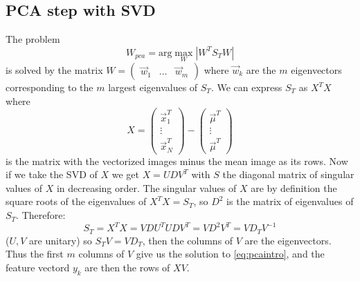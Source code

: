 \documentclass{amsart}
\theoremstyle{definition}
\theoremstyle{remark}
\begin{document}
\subsection{PCA step with SVD}
The problem
\begin{equation*}W_{pca} = \text{arg}\max_W |W^T S_T W|
\label{eq:pca}\end{equation*}
is solved by the matrix 
$W = \begin{pmatrix} \vec{w}_1 & \ldots & \vec{w}_m\end{pmatrix} $
where $\vec{w}_k$ are the $m$ eigenvectors corresponding to the $m$ largest eigenvalues of $S_T$. 
We can express $S_T$ as $X^TX$ where 
$$X = \begin{pmatrix}\vec{x}_1^T\\ \vdots \\ \vec{x}_N^T\end{pmatrix} - \begin{pmatrix} \vec{\mu}^T\\ \vdots \\\vec{\mu}^T\end{pmatrix} $$
is the matrix with the vectorized images minus the mean image as its rows. 
Now if we take the SVD of $X$ we get $X = UDV^T$ with $S$ the diagonal matrix of singular values of $X$ in decreasing order. The singular values of $X$ are by definition the square roots of the 
eigenvalues of $X^TX = S_T$, so $D^2$ is the matrix of eigenvalues of $S_T$. Therefore: 
$$S_T = X^T X = VDU^TUDV^T = VD^2V^T = VD_TV^{-1} $$
($U, V$ are unitary) so $S_TV = VD_T$, then the columns of $V$ are the eigenvectors. Thus the first $m$ columns of $V$ give us the solution to \ref{eq:pcaintro}, and the feature vectord $y_k$ are then the rows of $XV$. 
\end{document}

